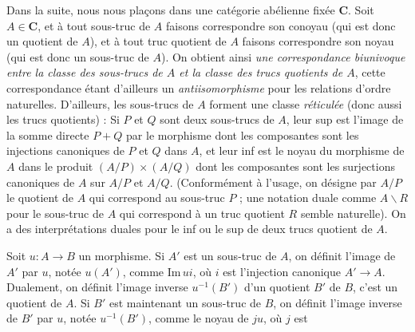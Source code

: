 Dans la suite, nous nous plaçons dans une catégorie abélienne fixée $\mathbf{C}$. Soit
$A\in\mathbf{C}$, et à tout sous-truc de $A$ faisons correspondre son conoyau (qui est
donc un quotient de $A$), et à tout truc quotient de $A$ faisons correspondre
son noyau (qui est donc un sous-truc de $A$). On obtient ainsi \textit{une
correspondance biunivoque entre la classe des sous-trucs de $A$ et la classe
des trucs quotients de $A$}, cette correspondance étant d'ailleurs un
\textit{antiisomorphisme} pour les relations d'ordre naturelles. D'ailleurs,
les sous-trucs de $A$ forment une classe \textit{réticulée} (donc aussi les
trucs quotients) : Si $P$ et $Q$ sont deux sous-trucs de $A$, leur sup est
l'image de la somme directe $P+Q$ par le morphisme dont les composantes sont
les injections canoniques de $P$ et $Q$ dans $A$, et leur inf est le noyau du
morphisme de $A$ dans le produit $(A/P)\times(A/Q)$ dont les composantes sont les surjections canoniques de $A$ sur
$A/P$ et $A/Q$. (Conformément à l'usage, on désigne par $A/P$ le quotient de
$A$ qui correspond au sous-truc $P$ ; une notation duale comme
$A\backslash R$ pour le sous-truc de $A$ qui correspond à un truc quotient $R$
semble naturelle). On a des interprétations duales pour le inf ou le sup de
deux trucs quotient de $A$.

Soit $u:A\to B$ un morphisme. Si $A'$ est un sous-truc de $A$, on
définit l'image de $A'$ par $u$, notée $u(A')$, comme $\mathrm{Im}\,ui$, où
$i$ est l'injection canonique $A'\to A$. Dualement, on définit
l'image inverse $u^{-1}(B')$ d'un quotient $B'$ de $B$, c'est un quotient de
$A$. Si $B'$ est maintenant un sous-truc de $B$, on définit l'image inverse de
$B'$ par $u$, notée $u^{-1}(B')$, comme le noyau de $ju$, où $j$ est

